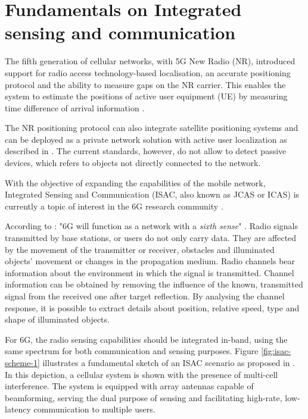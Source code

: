 \chapter{Fundamentals on Integrated sensing and communication}

\alert{The fifth generation of cellular networks, with 5G New Radio (NR), introduced support for radio access technology-based localisation, an accurate positioning protocol and the ability to measure gaps on the NR carrier. 
This enables the system to estimate the positions of active user equipment (UE) by measuring time difference of arrival information \cite{Keating_Saily_Hulkkonen_Karjalainen_2019}.}

The NR positioning protocol can also integrate satellite positioning systems and can be deployed as a private network solution with active user localization as described in  \cite{Henninger_Abrudan_Mandelli_Arnold_Saur_Kolmonen_Klein_Schlitter_Brink_2022}.
The current standards, however, do not allow to detect passive devices, which refers to objects not directly connected to the network.

With the objective of expanding the capabilities of the mobile network, Integrated Sensing and Communication (ISAC, also known as JCAS or ICAS) is currently a topic of interest in the 6G research community \cite{Mandelli_Henninger_Bauhofer_Wild_2023}.

According to \cite{Viswanathan_Wild_2021}: "6G will function as a network with a \textit{sixth sense}" . Radio signals transmitted by base stations, or users do not only carry data. They are affected by the movement of the transmitter or receiver, obstacles and illuminated objects' movement or changes in the propagation medium. Radio channels bear information about the environment in which the signal is transmitted. 
Channel information can be obtained by removing the influence of the known, transmitted signal from the received one after target reflection. By analysing the channel response, it is possible to extract details about position, relative speed, type and shape of illuminated objects.

For 6G, the radio sensing capabilities should be integrated in-band, using the same spectrum for both communication and sensing purposes. Figure \ref{fig:isac-scheme-1} illustrates a fundamental sketch of an ISAC scenario as proposed in \cite{Wild_Grudnitsky_Mandelli_Henninger_Guan_Schaich_2023}. In this depiction, a cellular system is shown with the presence of multi-cell interference. The system is equipped with array antennas capable of beamforming, serving the dual purpose of sensing and facilitating high-rate, low-latency communication to multiple users.

